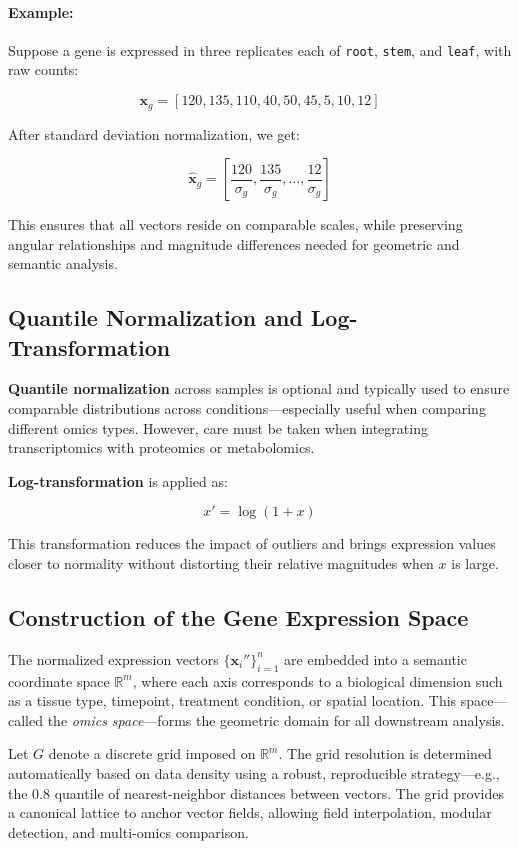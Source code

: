 \documentclass[11pt]{article}
\begin{document}
\paragraph{Example:}  
Suppose a gene is expressed in three replicates each of \texttt{root}, \texttt{stem}, and \texttt{leaf}, with raw counts:

\[
\mathbf{x}_g = [120, 135, 110, 40, 50, 45, 5, 10, 12]
\]

After standard deviation normalization, we get:

\[
\hat{\mathbf{x}}_g = \left[ \frac{120}{\sigma_g}, \frac{135}{\sigma_g}, \dots, \frac{12}{\sigma_g} \right]
\]

This ensures that all vectors reside on comparable scales, while preserving angular relationships and magnitude differences needed for geometric and semantic analysis.

\subsection{Quantile Normalization and Log-Transformation}

\textbf{Quantile normalization} across samples is optional and typically used to ensure comparable distributions across conditions—especially useful when comparing different omics types. However, care must be taken when integrating transcriptomics with proteomics or metabolomics.

\textbf{Log-transformation} is applied as:

\[
x' = \log(1 + x)
\]

This transformation reduces the impact of outliers and brings expression values closer to normality without distorting their relative magnitudes when \( x \) is large.


\subsection{Construction of the Gene Expression Space}

The normalized expression vectors $\{\mathbf{x}_i''\}_{i=1}^n$ are embedded into a semantic coordinate space $\mathbb{R}^m$, where each axis corresponds to a biological dimension such as a tissue type, timepoint, treatment condition, or spatial location. This space—called the \textit{omics space}—forms the geometric domain for all downstream analysis.

Let $G$ denote a discrete grid imposed on $\mathbb{R}^m$. The grid resolution is determined automatically based on data density using a robust, reproducible strategy—e.g., the $0.8$ quantile of nearest-neighbor distances between vectors. The grid provides a canonical lattice to anchor vector fields, allowing field interpolation, modular detection, and multi-omics comparison.
\end{document}
